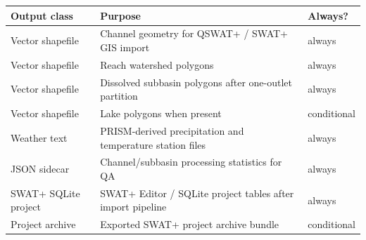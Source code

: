\begin{tabularx}{\textwidth}{@{}lYl@{}}
\toprule
Output class & Purpose & Always? \\
\midrule
Vector shapefile & Channel geometry for QSWAT+ / SWAT+ GIS import & always \\
Vector shapefile & Reach watershed polygons & always \\
Vector shapefile & Dissolved subbasin polygons after one-outlet partition & always \\
Vector shapefile & Lake polygons when present & conditional \\
Weather text & PRISM-derived precipitation and temperature station files & always \\
JSON sidecar & Channel/subbasin processing statistics for QA & always \\
SWAT+ SQLite project & SWAT+ Editor / SQLite project tables after import pipeline & always \\
Project archive & Exported SWAT+ project archive bundle & conditional \\
\bottomrule
\end{tabularx}
